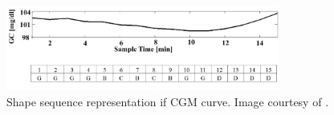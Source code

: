\begin{figure}[ht!]
  \centering
  \includegraphics[width=0.8\textwidth]{images/curve2shape.jpg}
  \caption[]
  {\small Shape sequence representation if CGM curve. Image courtesy of \textcite{samadi2017}.}
  \label{fig:curve2shape}
\end{figure}
